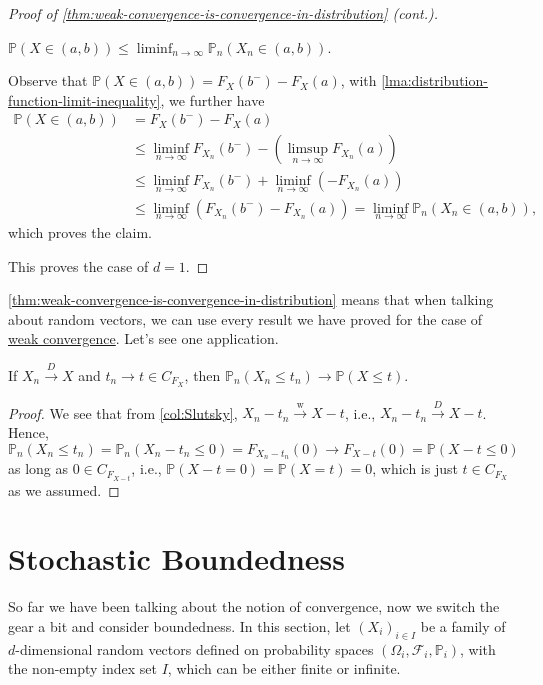 \begin{proof}[Proof of \autoref{thm:weak-convergence-is-convergence-in-distribution} (cont.)]
	\begin{claim}
		\(\mathbb{P} (X \in (a, b)) \leq \liminf_{n \to \infty} \mathbb{P} _{n}(X_n \in (a, b))\).
	\end{claim}
	\begin{explanation}
		Observe that \(\mathbb{P} (X \in (a, b)) = F_X(b^-) - F_X(a)\), with \autoref{lma:distribution-function-limit-inequality}, we further have
		\[
			\begin{split}
				\mathbb{P} (X \in (a, b))
				 & = F_X(b^-) - F_X(a)                                                                         \\
				 & \leq \liminf_{n \to \infty} F_{X_n}(b^-) - \left( \limsup_{n \to \infty} F_{X_n}(a) \right) \\
				 & \leq \liminf_{n \to \infty} F_{X_n}(b^-) + \liminf_{n \to \infty} (-F_{X_n}(a))             \\
				 & \leq \liminf_{n \to \infty} \left( F_{X_n}(b^-) - F_{X_n}(a) \right)
				= \liminf_{n \to \infty} \mathbb{P} _{n}(X_n \in (a, b)),
			\end{split}
		\]
		which proves the claim.
	\end{explanation}
	This proves the case of \(d = 1\).
\end{proof}

\autoref{thm:weak-convergence-is-convergence-in-distribution} means that when talking about random vectors, we can use every result we have proved for the case of \hyperref[def:converge-weakly]{weak convergence}. Let's see one application.

\begin{proposition}
	If \(X_n \overset{D}{\to } X\) and \(t_n \to t \in C_{F_X}\), then \(\mathbb{P} _{n}(X_n \leq t_n) \to \mathbb{P} (X \leq t)\).
\end{proposition}
\begin{proof}
	We see that from \autoref{col:Slutsky}, \(X_n - t_n \overset{\text{w} }{\to } X - t\), i.e., \(X_n - t_n \overset{D}{\to } X - t\). Hence,
	\[
		\mathbb{P} _{n}(X_n \leq t_n)
		= \mathbb{P} _{n}(X_n - t_n \leq 0)
		= F_{X_n - t_n} (0)
		\to F_{X - t} (0)
		= \mathbb{P} (X - t \leq 0)
	\]
	as long as \(0 \in C_{F_{X - t}}\), i.e., \(\mathbb{P} (X - t = 0) = \mathbb{P} (X = t) = 0\), which is just \(t \in C_{F_X}\) as we assumed.
\end{proof}

\section{Stochastic Boundedness}
So far we have been talking about the notion of convergence, now we switch the gear a bit and consider boundedness. In this section, let \((X_i)_{i \in I}\) be a family of \(d\)-dimensional random vectors defined on probability spaces \((\Omega _i, \mathscr{F} _i, \mathbb{P} _i)\), with the non-empty index set \(I\), which can be either finite or infinite.

